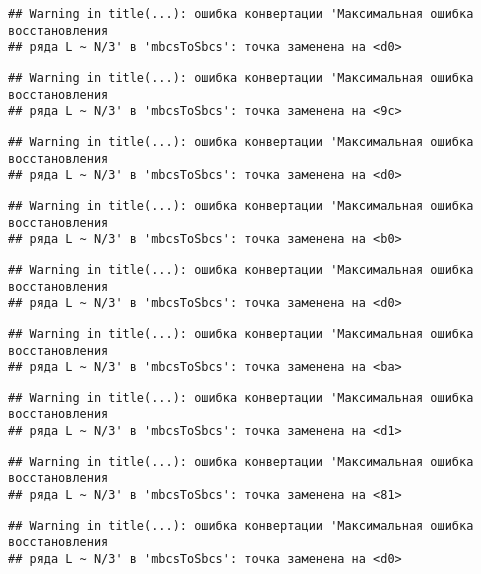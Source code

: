 \documentclass[
]{article}
\begin{document}
\begin{verbatim}
## Warning in title(...): ошибка конвертации 'Максимальная ошибка восстановления
## ряда L ~ N/3' в 'mbcsToSbcs': точка заменена на <d0>
\end{verbatim}

\begin{verbatim}
## Warning in title(...): ошибка конвертации 'Максимальная ошибка восстановления
## ряда L ~ N/3' в 'mbcsToSbcs': точка заменена на <9c>
\end{verbatim}

\begin{verbatim}
## Warning in title(...): ошибка конвертации 'Максимальная ошибка восстановления
## ряда L ~ N/3' в 'mbcsToSbcs': точка заменена на <d0>
\end{verbatim}

\begin{verbatim}
## Warning in title(...): ошибка конвертации 'Максимальная ошибка восстановления
## ряда L ~ N/3' в 'mbcsToSbcs': точка заменена на <b0>
\end{verbatim}

\begin{verbatim}
## Warning in title(...): ошибка конвертации 'Максимальная ошибка восстановления
## ряда L ~ N/3' в 'mbcsToSbcs': точка заменена на <d0>
\end{verbatim}

\begin{verbatim}
## Warning in title(...): ошибка конвертации 'Максимальная ошибка восстановления
## ряда L ~ N/3' в 'mbcsToSbcs': точка заменена на <ba>
\end{verbatim}

\begin{verbatim}
## Warning in title(...): ошибка конвертации 'Максимальная ошибка восстановления
## ряда L ~ N/3' в 'mbcsToSbcs': точка заменена на <d1>
\end{verbatim}

\begin{verbatim}
## Warning in title(...): ошибка конвертации 'Максимальная ошибка восстановления
## ряда L ~ N/3' в 'mbcsToSbcs': точка заменена на <81>
\end{verbatim}

\begin{verbatim}
## Warning in title(...): ошибка конвертации 'Максимальная ошибка восстановления
## ряда L ~ N/3' в 'mbcsToSbcs': точка заменена на <d0>
\end{verbatim}
\end{document}
